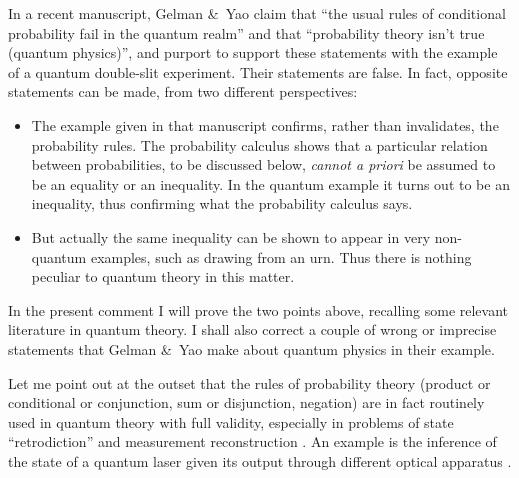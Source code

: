 \documentclass[\ifafour a4paper,12pt,\else a5paper,10pt,\fi%
onecolumn,oneside,article,%
british%
]{memoir}
\theoremstyle{remark}
\theoremstyle{innote}
\newcommand*{\citep}{\parencites}%
\newcommand*{\citey}{\parencites*}
\newcommand*{\amp}{\&}
\renewcommand*{\|}[1][]{\nonscript\,#1\vert\nonscript\;\mathopen{}}
\newcommand*{\sect}{\S}%
\newcommand*{\chaps}{chs}%
\begin{document}
In a recent manuscript, Gelman \amp\ Yao \citey{gelmanetal2020} claim that
\enquote{the usual rules of conditional probability fail in the quantum
  realm} and that \enquote{probability theory isn't true (quantum physics)}, and
purport to support these statements with the example of a quantum
double-slit experiment. Their statements are
false. %
In fact, opposite statements can be made, from two different
perspectives: %
\begin{itemize}
\item The example given in that manuscript confirms, rather than
  invalidates, the probability rules. The probability calculus shows that a
  particular relation between probabilities, to be discussed below,
  \emph{cannot a priori} be assumed to be an equality or an inequality. In
  the quantum example it turns out to be an inequality, thus confirming
  what the probability calculus says.
\item But actually the same inequality can be shown to appear in very
  non-quantum examples, such as drawing from an urn. Thus there is nothing
  peculiar to quantum theory in this matter.
\end{itemize}

In the present comment I will prove the two points above, recalling some
relevant literature in quantum theory. I shall also correct a couple of
wrong or imprecise statements that Gelman \amp\ Yao make about quantum
physics in their example.

Let me point out at the outset that the rules of probability theory
(product or conditional or conjunction, sum or disjunction, negation) are
in fact routinely used in quantum theory with full validity, especially in
problems of state \enquote{retrodiction} and measurement reconstruction
\citep{jones1991b,slater1995b}[\chaps~7,8]{demuynck2002b_2004}{barnettetal2003,zimanetal2004_r2006,darianoetal2004}[see][\sect~1
and the rest of the present comment for many further
references]{maanssonetal2006}. An example is the inference of the state of
a quantum laser given its output through different optical apparatus
\citep{leonhardt1997}.
\end{document}
